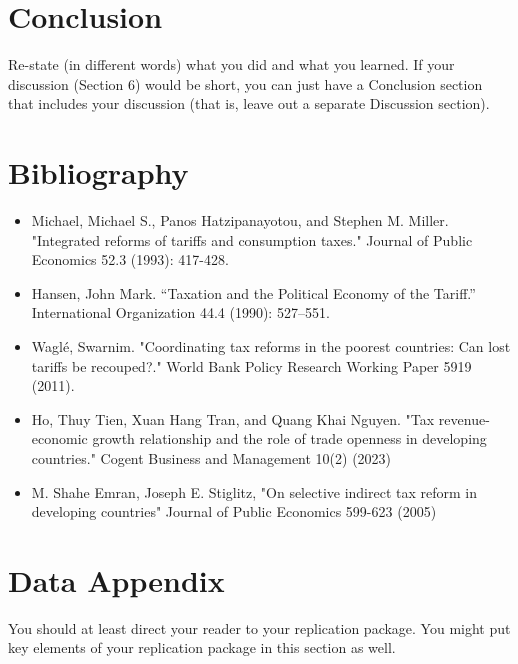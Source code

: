 \documentclass[12pt]{article}
\begin{document}
\section{Conclusion}
\label{sec:conclusion}

Re-state (in different words) what you did and what you learned. If your discussion (Section 6) would be short, you can just have a Conclusion section that includes your discussion (that is, leave out a separate Discussion section).

\newpage
\section*{Bibliography}
\singlespacing
\setlength\bibsep{0pt}

\begin{itemize}
\item Michael, Michael S., Panos Hatzipanayotou, and Stephen M. Miller. "Integrated reforms of tariffs and consumption taxes." Journal of Public Economics 52.3 (1993): 417-428.
\item Hansen, John Mark. “Taxation and the Political Economy of the Tariff.” International Organization 44.4 (1990): 527–551.
\item Waglé, Swarnim. "Coordinating tax reforms in the poorest countries: Can lost tariffs be recouped?." World Bank Policy Research Working Paper 5919 (2011).
\item Ho, Thuy Tien, Xuan Hang Tran, and Quang Khai Nguyen. "Tax revenue-economic growth relationship and the role of trade openness in developing countries." Cogent Business and Management 10(2) (2023)
\item M. Shahe Emran, Joseph E. Stiglitz, "On selective indirect tax reform in developing countries" Journal of Public Economics 599-623 (2005)
\end{itemize}










\newpage
\section*{Data Appendix} \label{sec:appendixa}

You should at least direct your reader to your replication package. You might put key elements of your replication package in this section as well.
\end{document}
